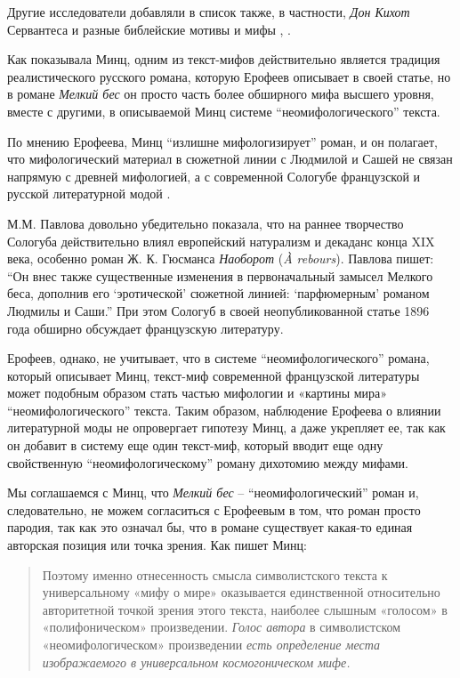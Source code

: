 \documentclass[12pt,a4paper]{article}
\begin{document}
Другие исследователи добавляли в список также, в частности, \emph{Дон Кихот} Сервантеса \parencite{bagno2009} и разные библейские мотивы и мифы \parencite{kobrinski2013}, \parencite[272]{silard1984}.


 
Как показывала Минц, одним из текст-мифов действительно является традиция реалистического русского романа, которую Ерофеев описывает в своей статье, но в романе \emph{Мелкий бес} он просто часть более обширного мифа высшего уровня, вместе с другими, в описываемой Минц системе \enquote{неомифологического} текста.


По мнению Ерофеева, Минц \enquote{излишне мифологизирует} роман, и он полагает, что мифологический материал в сюжетной линии с Людмилой и Сашей не связан напрямую с древней мифологией, а с современной Сологубе французской и русской литературной модой \parencite[152]{jerofeev1985}.

М.М. Павлова довольно убедительно показала, что на раннее творчество Сологуба действительно влиял европейский натурализм и декаданс конца XIX века, особенно роман Ж. К. Гюсманса \emph{Наоборот} (\emph{À rebours}). Павлова пишет: \enquote{Он внес также существенные изменения в первоначальный замысел \emph{}{Мелкого беса}, дополнив его \enquote{эротической} сюжетной линией: \enquote{парфюмерным} романом Людмилы и Саши.} \parencite[168.]{pavlova2007} При этом Сологуб в своей неопубликованной статье 1896 года  обширно обсуждает французскую литературу.

Ерофеев, однако, не учитывает, что в системе \enquote{неомифологического} романа, который описывает Минц, текст-миф современной французской литературы может подобным образом стать частью мифологии и «картины мира» \enquote{неомифологического} текста. Таким образом, наблюдение Ерофеева о влиянии литературной моды не опровергает гипотезу Минц, а даже укрепляет ее, так как он добавит в систему еще один текст-миф, который вводит еще одну свойственную \enquote{неомифологическому} роману дихотомию между мифами.

Мы соглашаемся с Минц, что \emph{Мелкий бес} -- \enquote{неомифологический} роман и, следовательно, не можем согласиться с Ерофеевым в том, что роман просто пародия, так как это означал бы, что в романе существует какая-то единая авторская позиция или точка зрения. Как пишет Минц:

\begin{quote}
Поэтому именно отнесенность смысла символистского текста к универсальному «мифу о мире» оказывается единственной относительно авторитетной точкой зрения этого текста, наиболее слышным «голосом» в «полифоническом» произведении. \emph{Голос автора} в символистском «неомифологическом» произведении \emph{есть определение места изображаемого в универсальном космогоническом мифе.}

\parencite[77.]{mints2004}
\end{quote}
\end{document}
